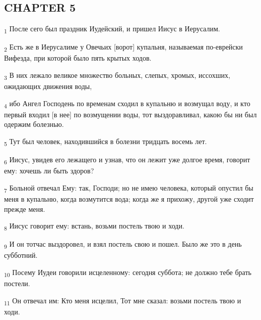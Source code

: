 \subsection{CHAPTER 5}
\begin{tcolorbox}
\textsubscript{1} После сего был праздник Иудейский, и пришел Иисус в Иерусалим.
\end{tcolorbox}
\begin{tcolorbox}
\textsubscript{2} Есть же в Иерусалиме у Овечьих [ворот] купальня, называемая по-еврейски Вифезда, при которой было пять крытых ходов.
\end{tcolorbox}
\begin{tcolorbox}
\textsubscript{3} В них лежало великое множество больных, слепых, хромых, иссохших, ожидающих движения воды,
\end{tcolorbox}
\begin{tcolorbox}
\textsubscript{4} ибо Ангел Господень по временам сходил в купальню и возмущал воду, и кто первый входил [в нее] по возмущении воды, тот выздоравливал, какою бы ни был одержим болезнью.
\end{tcolorbox}
\begin{tcolorbox}
\textsubscript{5} Тут был человек, находившийся в болезни тридцать восемь лет.
\end{tcolorbox}
\begin{tcolorbox}
\textsubscript{6} Иисус, увидев его лежащего и узнав, что он лежит уже долгое время, говорит ему: хочешь ли быть здоров?
\end{tcolorbox}
\begin{tcolorbox}
\textsubscript{7} Больной отвечал Ему: так, Господи; но не имею человека, который опустил бы меня в купальню, когда возмутится вода; когда же я прихожу, другой уже сходит прежде меня.
\end{tcolorbox}
\begin{tcolorbox}
\textsubscript{8} Иисус говорит ему: встань, возьми постель твою и ходи.
\end{tcolorbox}
\begin{tcolorbox}
\textsubscript{9} И он тотчас выздоровел, и взял постель свою и пошел. Было же это в день субботний.
\end{tcolorbox}
\begin{tcolorbox}
\textsubscript{10} Посему Иудеи говорили исцеленному: сегодня суббота; не должно тебе брать постели.
\end{tcolorbox}
\begin{tcolorbox}
\textsubscript{11} Он отвечал им: Кто меня исцелил, Тот мне сказал: возьми постель твою и ходи.
\end{tcolorbox}
